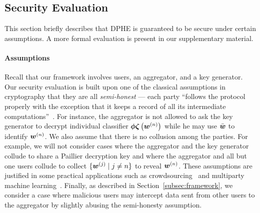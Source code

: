 \documentclass[10pt,twocolumn,letterpaper]{article}
\def\vct#1{\mbox{\boldmath $#1$}}
\def\ui#1{^{(#1)}}
\def\perm{\vct{\phi}}
\def\he#1{\vct{\zeta}\left(#1\right)}
\begin{document}
\subsection{Security Evaluation}
\label{sec:proof}
This section briefly describes that DPHE is guaranteed to be secure under certain assumptions. A more formal evaluation is present in our supplementary material.

\paragraph{Assumptions}
Recall that our framework involves users, an aggregator, and a key generator. Our security evaluation is built upon one of the classical assumptions in cryptography that they are all \emph{semi-honest} --- each party ``follows the protocol properly with the exception that it keeps a record of all its intermediate computations''~\cite{OdedGoldreich2004}. For instance, the aggregator is not allowed to ask the key generator to decrypt individual classifier $\perm\he{\vct{w}\ui{n}}$ while he may use $\bar{\vct{w}}$ to identify $\vct{w}\ui{n}$. We also assume that there is no collusion among the parties. For example, we will not consider cases where the aggregator and the key generator collude to share a Paillier decryption key and where the aggregator and all but one users collude to collect $\{\vct{w}\ui{j}\mid j\neq n\}$ to reveal $\vct{w}\ui{n}$. These assumptions are justified in some practical applications such as crowdsourcing~\cite{Kajino2014a} and multiparty machine learning~\cite{Pathak2010a}. Finally, as described in Section~\ref{subsec:framework}, we consider a case where malicious users may intercept data sent from other users to the aggregator by slightly abusing the semi-honesty assumption.
\end{document}
